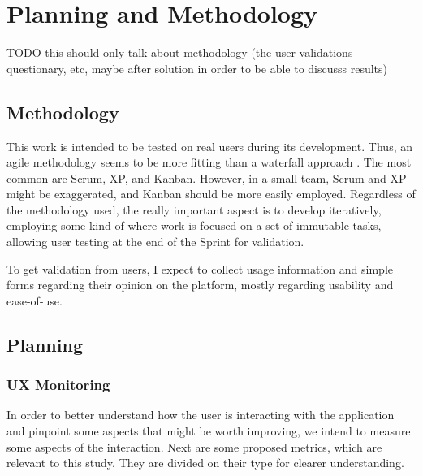 \chapter{Planning and Methodology}\label{chap:problem-planning}

{\Huge TODO this should only talk about methodology (the user validations questionary, etc, maybe after solution in order to be able to discusss results)}

\section{Methodology}\label{sec:prob-methodology}

This work is intended to be tested on real users during its development. Thus, an agile methodology seems to be more fitting than a waterfall approach \cite{beck2001agile}. The most common are Scrum, XP, and Kanban. However, in a small team, Scrum and XP might be exaggerated, and Kanban should be more easily employed. Regardless of the methodology used, the really important aspect is to develop iteratively, employing some kind of  where work is focused on a set of immutable tasks, allowing user testing at the end of the Sprint for validation. 

To get validation from users, I expect to collect usage information and simple forms regarding their opinion on the platform, mostly regarding usability and ease-of-use. 

\section{Planning}\label{sec:prob-planning}

\subsection{UX Monitoring}

In order to better understand how the user is interacting with the application and pinpoint some aspects that might be worth improving, we intend to measure some aspects of the interaction. Next are some proposed metrics, which are relevant to this study. They are divided on their type for clearer understanding.


